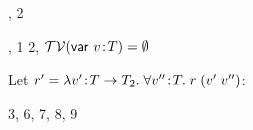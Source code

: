 \begin{bycase}
\Case{\Rtbool}

\Case{\Rtvar}
\begin{derivation}
\step{\tvar\in\cxtvarO}{\premof{\Rtvar}}
\end{derivation}

\Case{\Rtinst}
\begin{derivation}
\end{derivation}

\Case{\Rtarr}
\begin{derivation}
     {\indhyp, 2}
\end{derivation}

\Case{\Rstarr}
\begin{derivation}
     {\indhyp, 1}
     {2, $\mathcal{TV}(\mathsf{var}\ v\!:\!T)=\emptyset$}
\end{derivation}
Let $r'=\lambda v'\!:\!T\to T_2.\;\forall v''\!:\!T.\;r\;(v'\;v'')$:
\begin{derivatioN}{6}
     {3, 6, }
     {7, 8, 9}
\end{derivatioN}


\end{bycase}
